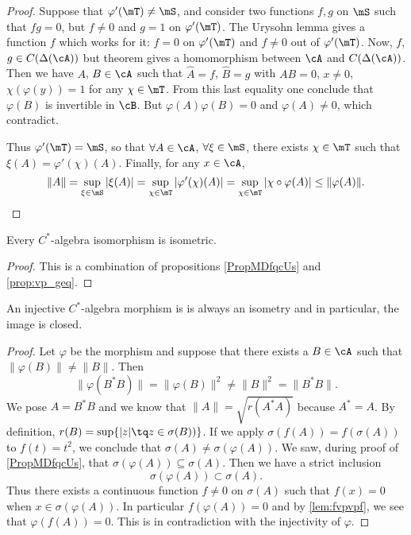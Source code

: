 \begin{proof}
Suppose that $\varphi'(\mT)\neq\mS$, and consider two functions $f,g$ on $\mS$ such that $fg=0$, but $f\neq 0$ and $g=1$ on $\varphi'(\mT)$. The Urysohn lemma gives a function $f$ which works for it: $f=0$ on $\varphi'(\mT)$ and $f\neq 0$ out of $\varphi'(\mT)$. Now, $f$, $g\in C(\Delta(\cA))$ but theorem  gives a homomorphism between $\cA$ and $C(\Delta(\cA))$. Then we have $A$, $B\in\cA$ such that $\hat{A}=f$,  $\hat{B}=g$ with $AB=0$, $x\neq 0$, $\chi(\varphi(y))=1$ for any $\chi\in\mT$. From this last equality one conclude that $\varphi(B)$ is invertible in $\cB$. But $\varphi(A)\varphi(B)=0$ and $\varphi(A)\neq 0$, which contradict.

Thus $\varphi'(\mT)=\mS$, so that $\forall A\in\cA$, $\forall\xi\in\mS$, there exists $\chi\in\mT$ such that $\xi(A)=\varphi'(\chi)(A)$. Finally, for any $x\in\cA$,
\begin{equation}
 \|A\|=\sup_{\xi\in\mS}|\xi(A)|
      =\sup_{\chi\in\mT}|\varphi'(\chi)(A)|
      =\sup_{\chi\in\mT}|\chi\circ\varphi(A)|
      \leq\|\varphi(A)\|.
\end{equation}

\end{proof}

\begin{proposition}
    Every \( C^*\)-algebra isomorphism is isometric.
\end{proposition}

\begin{proof}
    This is a combination of propositions \ref{PropMDfqcUs} and \ref{prop:vp_geq}.
\end{proof}

\begin{lemma}  \label{lem:injmorpisom}
An injective $C^*$-algebra morphism is is always an isometry and in particular, the image is closed.
\end{lemma}

\begin{proof}
Let $\varphi$ be the morphism and suppose that there exists a $B\in\cA$ such that $\| \varphi(B) \|\neq \| B \|$. Then
\[ 
  \| \varphi(B^*B) \|=\| \varphi(B) \|^2\neq\| B \|^2=\| B^*B \|.
\]
We pose $A=B^*B$ and we know that $\| A \|=\sqrt{r(A^*A)}$ because $A^*=A$. By definition, $r(B)=\sup\{ | z |\tq z\in\sigma(B)) \}$. If we apply $\sigma(f(A))=f(\sigma(A))$ to $f(t)=t^2$, we conclude that $\sigma(A)\neq\sigma(\varphi(A))$. We saw, during proof of \ref{PropMDfqcUs}, that $\sigma(\varphi(A))\subseteq\sigma(A)$. Then we have a strict inclusion 
\[ 
   \sigma(\varphi(A))\subset\sigma(A).
\]
Thus there exists a continuous function $f\neq 0$ on $\sigma(A)$ such that $f(x)=0$ when $x\in\sigma(\varphi(A))$. In particular $f(\varphi(A))=0$ and by \ref{lem:fvpvpf}, we see that $\varphi(f(A))=0$. This is in contradiction with the injectivity of $\varphi$. 

\end{proof}

